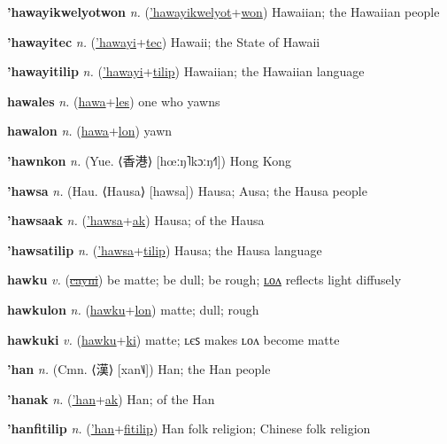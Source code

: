 \textbf{\hypertarget{'hawayikwelyotwon}{'hawayikwelyotwon}} \textit{n.} (\hyperlink{'hawayikwelyot}{'hawayikwelyot}+\allowbreak \hyperlink{won}{won})
Hawaiian; the Hawaiian people

\textbf{\hypertarget{'hawayitec}{'hawayitec}} \textit{n.} (\hyperlink{'hawayi}{'hawayi}+\allowbreak \hyperlink{tec}{tec})
Hawaii; the State of Hawaii

\textbf{\hypertarget{'hawayitilip}{'hawayitilip}} \textit{n.} (\hyperlink{'hawayi}{'hawayi}+\allowbreak \hyperlink{tilip}{tilip})
Hawaiian; the Hawaiian language

\textbf{\hypertarget{hawales}{hawales}} \textit{n.} (\hyperlink{hawa}{hawa}+\allowbreak \hyperlink{les}{les})
one who yawns

\textbf{\hypertarget{hawalon}{hawalon}} \textit{n.} (\hyperlink{hawa}{hawa}+\allowbreak \hyperlink{lon}{lon})
yawn

\textbf{\hypertarget{'hawnkon}{'hawnkon}} \textit{n.} (Yue. ⟨{\chinese{}香港}⟩ [hœːŋ˥kɔːŋ˧˥])
Hong Kong

\textbf{\hypertarget{'hawsa}{'hawsa}} \textit{n.} (Hau. ⟨Hausa⟩ [hawsa])
Hausa; Ausa; the Hausa people

\textbf{\hypertarget{'hawsaak}{'hawsaak}} \textit{n.} (\hyperlink{'hawsa}{'hawsa}+\allowbreak \hyperlink{ak}{ak})
Hausa; of the Hausa

\textbf{\hypertarget{'hawsatilip}{'hawsatilip}} \textit{n.} (\hyperlink{'hawsa}{'hawsa}+\allowbreak \hyperlink{tilip}{tilip})
Hausa; the Hausa language

\textbf{\hypertarget{hawku}{hawku}} \textit{v.} (\hyperlink{cayni}{\sout{cayni}})
be matte; be dull; be rough; \hyperlink{hawkulon}{ʟᴏᴧ} reflects light diffusely

\textbf{\hypertarget{hawkulon}{hawkulon}} \textit{n.} (\hyperlink{hawku}{hawku}+\allowbreak \hyperlink{lon}{lon})
matte; dull; rough

\textbf{\hypertarget{hawkuki}{hawkuki}} \textit{v.} (\hyperlink{hawku}{hawku}+\allowbreak \hyperlink{ki}{ki})
matte; ʟєꜱ makes ʟᴏᴧ become matte

\textbf{\hypertarget{'han}{'han}} \textit{n.} (Cmn. ⟨{\chinese{}漢}⟩ [xan˥˩])
Han; the Han people

\textbf{\hypertarget{'hanak}{'hanak}} \textit{n.} (\hyperlink{'han}{'han}+\allowbreak \hyperlink{ak}{ak})
Han; of the Han

\textbf{\hypertarget{'hanfitilip}{'hanfitilip}} \textit{n.} (\hyperlink{'han}{'han}+\allowbreak \hyperlink{fitilip}{fitilip})
Han folk religion; Chinese folk religion

